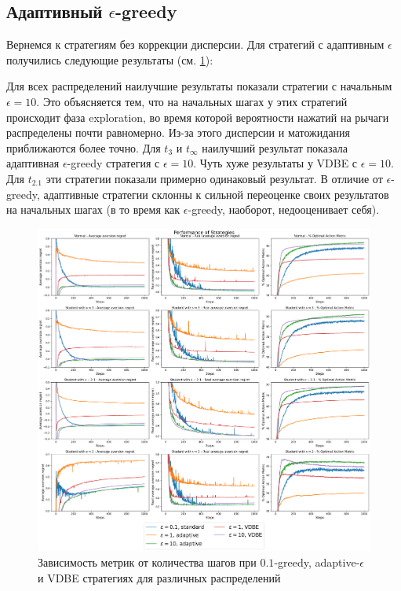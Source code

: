 \subsection{Адаптивный $\epsilon$-greedy}

Вернемся к стратегиям без коррекции дисперсии. Для стратегий с адаптивным $\epsilon$ получились следующие результаты (см. \ref{fig:adaptive_eps_strat_distr}):

Для всех распределений наилучшие результаты показали стратегии с начальным $\epsilon=10$. Это объясняется тем, что на начальных шагах у этих стратегий происходит фаза exploration, во время которой вероятности нажатий на рычаги распределены почти равномерно. Из-за этого дисперсии и матожидания приближаются более точно. Для $t_3$ и $t_{\infty}$ наилучший результат показала адаптивная $\epsilon$-greedy стратегия с $\epsilon=10$. Чуть хуже результаты у VDBE с $\epsilon=10$. Для $t_{2.1}$ эти стратегии показали примерно одинаковый результат. В отличие от $\epsilon$-greedy, адаптивные стратегии склонны к сильной переоценке своих результатов на начальных шагах (в то время как $\epsilon$-greedy, наоборот, недооценивает себя).

\begin{figure}[ht!] %
\centering
\includegraphics[width=6in]{theory_tester/theory_images/adaptive_epsilon/one_distr.png}
\caption{Зависимость метрик от количества шагов при $0.1$-greedy, adaptive-$\epsilon$ и VDBE стратегиях для различных распределений}
\label{fig:adaptive_eps_strat_distr}
\end{figure}

